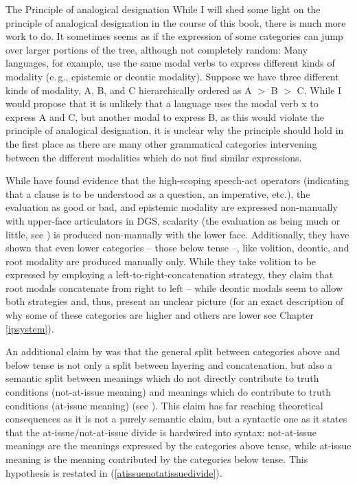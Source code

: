 \begin{savenotes}
\begin{digression}{The Principle of analogical designation}{}
While I will shed some light on the principle of analogical designation in the course of this book, there is much more work to do. It sometimes seems as if the expression of some categories can jump over larger portions of the tree, although not completely random: Many languages, for example, use the same modal verbs to express different kinds of modality (e.\,g., epistemic or deontic modality). Suppose we have three different kinds of modality, A, B, and C hierarchically ordered as A $>$ B $>$ C. While I would propose that it is unlikely that a language uses the modal verb x to express A and C, but another modal to express B, as this would violate the principle of analogical designation, it is unclear why the principle should hold in the first place as there are many other grammatical categories intervening between the different modalities which do not find similar expressions. 


\end{digression}
\end{savenotes}

\noindent While \citet{bross2017scope} have found evidence that the high-scoping speech-act operators (indicating that a clause is to be understood as a question, an imperative, etc.), the evaluation as good or bad, and epistemic modality are expressed non-manually with upper-face articulators in DGS, scalarity (the evaluation as being much or little, see \citealt{hole2015distributed}) is produced non-manually with the lower face. Additionally, they have shown that even lower categories -- those below tense --, like volition, deontic, and root modality are produced manually only. While they take volition to be expressed by employing a left-to-right-concatenation strategy, they claim that root modals concatenate from right to left -- while deontic modals seem to allow both strategies and, thus, present an unclear picture (for an exact description of why some of these categories are higher and others are lower see Chapter \ref{ipsystem}).

An additional claim by \citet{bross2017scope} was that the general split between categories above and below tense is not only a split between layering and concatenation, but also a semantic split between meanings which do not directly contribute to truth conditions (not-at-issue meaning) and meanings which do contribute to truth conditions (at-issue meaning) (see \citealt{simons2010projects, tonhauser2013toward}). This claim has far reaching theoretical consequences as it is not a purely semantic claim, but a syntactic one as it states that the at-issue/not-at-issue divide is hardwired into syntax: not-at-issue meanings are the meanings expressed by the categories above tense, while at-issue meaning is the meaning contributed by the categories below tense. This hypothesis is restated in (\ref{atissuenotatissuedivide}).

